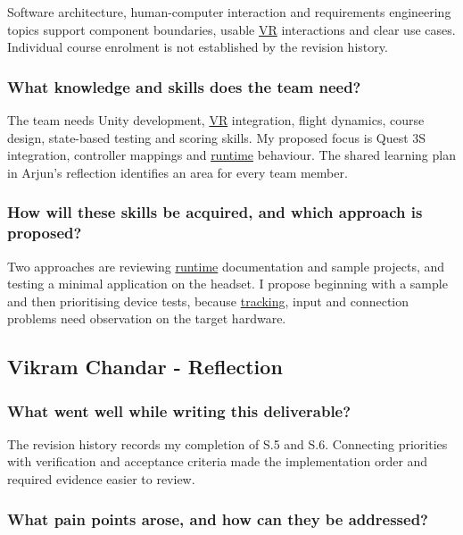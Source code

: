 \documentclass[12pt]{article}
\begin{document}
Software architecture, human-computer interaction and requirements engineering topics support component boundaries, usable \hyperlink{glos:VR}{VR} interactions and clear use cases. Individual course enrolment is not established by the revision history.

\subsubsection*{What knowledge and skills does the team need?}

The team needs Unity development, \hyperlink{glos:VR}{VR} integration, flight dynamics, course design, state-based testing and scoring skills. My proposed focus is Quest 3S integration, controller mappings and \hyperlink{glos:Runtime}{runtime} behaviour. The shared learning plan in Arjun's reflection identifies an area for every team member.

\subsubsection*{How will these skills be acquired, and which approach is proposed?}

Two approaches are reviewing \hyperlink{glos:Runtime}{runtime} documentation and sample projects, and testing a minimal application on the headset. I propose beginning with a sample and then prioritising device tests, because \hyperlink{glos:Tracking}{tracking}, input and connection problems need observation on the target hardware.

\subsection*{Vikram Chandar - Reflection}

\subsubsection*{What went well while writing this deliverable?}

The revision history records my completion of S.5 and S.6. Connecting priorities with verification and acceptance criteria made the implementation order and required evidence easier to review.

\subsubsection*{What pain points arose, and how can they be addressed?}
\end{document}
